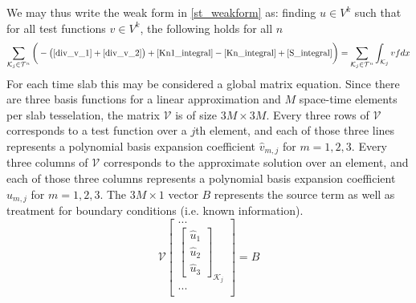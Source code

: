 \documentclass[11pt, oneside]{article}   	%
\begin{document}
We may thus write the weak form in \eqref{st_weakform} as: finding $u \in V^k$ such that for all test functions $v \in V^k$, the following holds for all $n$
\begin{equation}
\sum_{\mathcal{K}_j \in \mathcal{T}^n} \bigg( - \big(\eqref{div_v_1} + \eqref{div_v_2}\big) + \eqref{Kn1_integral} - \eqref{Kn_integral} + \eqref{S_integral} \bigg)  = 
\sum_{\mathcal{K}_j \in \mathcal{T}^n} \int_{\mathcal{K}_j} v f dx
\end{equation}
For each time slab this may be considered a global matrix equation.
Since there are three basis functions for a linear approximation and $M$ space-time elements per slab tesselation, the matrix $\mathcal{V}$ is of size $3M\times3M$.
Every three rows of $\mathcal{V}$ corresponds to a test function over a $j$th element, and each of those three lines represents a polynomial basis expansion coefficient $\hat{v}_{m,j}$ for $m=1,2,3$.
Every three columns of $\mathcal{V}$ corresponds to the approximate solution over an element, and each of those three columns represents a polynomial basis expansion coefficient $\hat{u}_{m,j}$ for $m=1,2,3$.
The $3M\times1$ vector $B$ represents the source term as well as treatment for boundary conditions (i.e. known information). 
\begin{equation}
\mathcal{V}
\begin{bmatrix}
	...\\
	\begin{bmatrix}
	\hat{u}_1 \\ \hat{u}_2 \\ \hat{u}_3
	\end{bmatrix}_{\mathcal{K}_j}\\
	...\\
\end{bmatrix}
= B
\end{equation}

\clearpage
\end{document}
